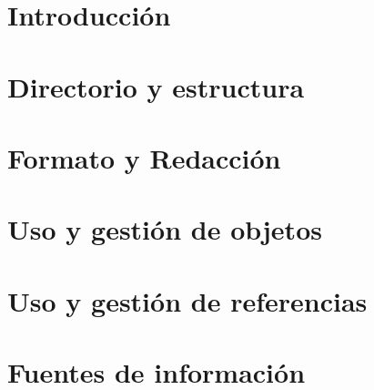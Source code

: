 \part{Introducción}

%
\part{Directorio y estructura}

%
\part{Formato y Redacción}

%
\part{Uso y gestión de objetos}

%
\part{Uso y gestión de referencias}

%
\part{Fuentes de información}

